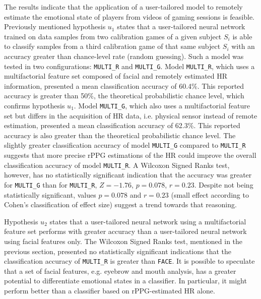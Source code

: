 

The results indicate that the application of a user-tailored model to remotely estimate the emotional state of players from videos of gaming sessions is feasible. Previously mentioned hypothesis $u_1$ states that a user-tailored neural network trained on data samples from two calibration games of a given subject $S_i$ is able to classify samples from a third calibration game of that same subject $S_i$ with an accuracy greater than chance-level rate (random guessing). Such a model was tested in two configurations: \texttt{MULTI\_R} and \texttt{MULTI\_G}. Model \texttt{MULTI\_R}, which uses a multifactorial feature set composed of facial and remotely estimated HR information, presented a mean classification accuracy of 60.4\%. This reported accuracy is greater than 50\%, the theoretical probabilistic chance level, which confirms hypothesis $u_1$. Model \texttt{MULTI\_G}, which also uses a multifactorial feature set but differs in the acquisition of HR data, i.e. physical sensor instead of remote estimation, presented a mean classification accuracy of 62.3\%. This reported accuracy is also greater than the theoretical probabilistic chance level. The slightly greater classification accuracy of model \texttt{MULTI\_G} compared to \texttt{MULTI\_R} suggests that more precise rPPG estimations of the HR could improve the overall classification accuracy of model \texttt{MULTI\_R}. A Wilcoxon Signed Ranks test, however, has no statistically significant indication that the accuracy was greater for \texttt{MULTI\_G} than for \texttt{MULTI\_R}, $Z=-1.76$, $p=0.078$, $r=0.23$. Despite not being statistically significant, values $p=0.078$ and $r=0.23$ (small effect according to Cohen's classification of effect size) suggest a trend towards that reasoning.

Hypothesis $u_2$ states that a user-tailored neural network using a multifactorial feature set performs with greater accuracy than a user-tailored neural network using facial features only. The Wilcoxon Signed Ranks test, mentioned in the previous section, presented no statistically significant indications that the classification accuracy of \texttt{MULTI\_R} is greater than \texttt{FACE}. It is possible to speculate that a set of facial features, e.g. eyebrow and mouth analysis, has a greater potential to differentiate emotional states in a classifier. In particular, it might perform better than a classifier based on rPPG-estimated HR alone.

